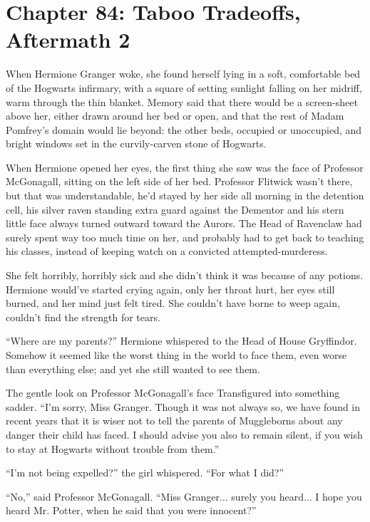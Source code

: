 \chapter{Chapter 84: Taboo Tradeoffs, Aftermath 2}
When Hermione Granger woke, she found herself lying in a soft, comfortable bed of the Hogwarts infirmary, with a square of setting sunlight falling on her midriff, warm through the thin blanket. Memory said that there would be a screen-sheet above her, either drawn around her bed or open, and that the rest of Madam Pomfrey's domain would lie beyond: the other beds, occupied or unoccupied, and bright windows set in the curvily-carven stone of Hogwarts.

When Hermione opened her eyes, the first thing she saw was the face of Professor McGonagall, sitting on the left side of her bed. Professor Flitwick wasn't there, but that was understandable, he'd stayed by her side all morning in the detention cell, his silver raven standing extra guard against the Dementor and his stern little face always turned outward toward the Aurors. The Head of Ravenclaw had surely spent way too much time on her, and probably had to get back to teaching his classes, instead of keeping watch on a convicted attempted-murderess.

She felt horribly, horribly sick and she didn't think it was because of any potions. Hermione would've started crying again, only her throat hurt, her eyes still burned, and her mind just felt tired. She couldn't have borne to weep again, couldn't find the strength for tears.

``Where are my parents?'' Hermione whispered to the Head of House Gryffindor. Somehow it seemed like the worst thing in the world to face them, even worse than everything else; and yet she still wanted to see them.

The gentle look on Professor McGonagall's face Transfigured into something sadder. ``I'm sorry, Miss Granger. Though it was not always so, we have found in recent years that it is wiser not to tell the parents of Muggleborns about any danger their child has faced. I should advise you also to remain silent, if you wish to stay at Hogwarts without trouble from them.''

``I'm not being expelled?'' the girl whispered. ``For what I did?''

``No,'' said Professor McGonagall. ``Miss Granger... surely you heard... I hope you heard Mr. Potter, when he said that you were innocent?''

